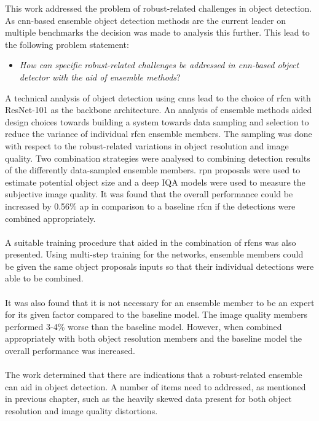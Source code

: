 This work addressed the problem of robust-related challenges in object detection. As \gls{cnn}-based ensemble object detection methods are the current leader on multiple benchmarks the decision was made to analysis this further. This lead to the following problem statement:

\begin{itemize}
\item \textit{How can specific robust-related challenges be addressed in \gls{cnn}-based object detector with the aid of ensemble methods}?
\end{itemize}

A technical analysis of object detection using \glspl{cnn} lead to the choice of \gls{rfcn} with ResNet-101 as the backbone architecture. An analysis of ensemble methods aided design choices towards building a system towards data sampling and selection to reduce the variance of individual \gls{rfcn} ensemble members. The sampling was done with respect to the robust-related variations in object resolution and image quality. Two combination strategies were analysed to combining detection results of the differently data-sampled ensemble members. \gls{rpn} proposals were used to estimate potential object size and a deep IQA models were used to measure the subjective image quality. It was found that the overall performance could be increased by 0.56\% \gls{ap} in comparison to a baseline \gls{rfcn} if the detections were combined appropriately. 
\\\\
A suitable training procedure that aided in the combination of \glspl{rfcn} was also presented. Using multi-step training for the networks, ensemble members could be given the same object proposals inputs so that their individual detections were able to be combined. 
\\\\
It was also found that it is not necessary for an ensemble member to be an expert for its given factor compared to the baseline model. The image quality members performed 3-4\% worse than the baseline model. However, when combined appropriately with both object resolution members and the baseline model the overall performance was increased.
\\\\
The work determined that there are indications that a robust-related ensemble can aid in object detection. A number of items need to addressed, as mentioned in previous chapter, such as the heavily skewed data present for both object resolution and image quality distortions. 